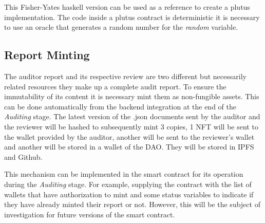 \documentclass[9pt]{article}
\begin{document}
This Fisher-Yates haskell version can be used as a reference to create a plutus implementation. The code inside a plutus contract is deterministic it is necessary to use an oracle that generates a random number for the \emph { random } variable.

\subsection { Report Minting }

The auditor report and its respective review are two different but necessarily related resources they make up a complete audit report. To ensure the immutability of its content it is necessary mint them as non-fungible assets. This can be done automatically from the backend integration at the end of the \emph{Auditing} stage. 
The latest version of the .json documents sent by the auditor and the reviewer will be hashed to subsequently mint 3 copies, 1 NFT will be sent to the wallet provided by the auditor, another will be sent to the reviewer's wallet and another will be stored in a wallet of the DAO. They will be stored in IPFS and Github.

This mechanism can be implemented in the smart contract for its operation during the \emph{Auditing} stage. For example, supplying the contract with the list of wallets that have authorization to mint and some status variables to indicate if they have already minted their report or not. However, this will be the subject of investigation for future versions of the smart contract.
\end{document}
